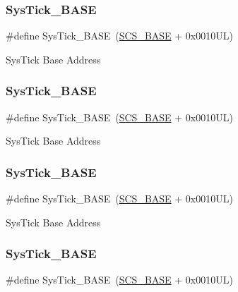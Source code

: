 \subsubsection{\texorpdfstring{SysTick\_BASE}{SysTick\_BASE}\hspace{0.1cm}{\footnotesize\ttfamily [5/12]}}
{\footnotesize\ttfamily \#define Sys\+Tick\+\_\+\+B\+A\+SE~(\mbox{\hyperlink{group___c_m_s_i_s__core__base_ga3c14ed93192c8d9143322bbf77ebf770}{S\+C\+S\+\_\+\+B\+A\+SE}} +  0x0010\+U\+L)}

Sys\+Tick Base Address \mbox{\label{group___c_m_s_i_s__core__base_ga58effaac0b93006b756d33209e814646}} 
\subsubsection{\texorpdfstring{SysTick\_BASE}{SysTick\_BASE}\hspace{0.1cm}{\footnotesize\ttfamily [6/12]}}
{\footnotesize\ttfamily \#define Sys\+Tick\+\_\+\+B\+A\+SE~(\mbox{\hyperlink{group___c_m_s_i_s__core__base_ga3c14ed93192c8d9143322bbf77ebf770}{S\+C\+S\+\_\+\+B\+A\+SE}} +  0x0010\+U\+L)}

Sys\+Tick Base Address \mbox{\label{group___c_m_s_i_s__core__base_ga58effaac0b93006b756d33209e814646}} 
\subsubsection{\texorpdfstring{SysTick\_BASE}{SysTick\_BASE}\hspace{0.1cm}{\footnotesize\ttfamily [7/12]}}
{\footnotesize\ttfamily \#define Sys\+Tick\+\_\+\+B\+A\+SE~(\mbox{\hyperlink{group___c_m_s_i_s__core__base_ga3c14ed93192c8d9143322bbf77ebf770}{S\+C\+S\+\_\+\+B\+A\+SE}} +  0x0010\+U\+L)}

Sys\+Tick Base Address \mbox{\label{group___c_m_s_i_s__core__base_ga58effaac0b93006b756d33209e814646}} 
\subsubsection{\texorpdfstring{SysTick\_BASE}{SysTick\_BASE}\hspace{0.1cm}{\footnotesize\ttfamily [8/12]}}
{\footnotesize\ttfamily \#define Sys\+Tick\+\_\+\+B\+A\+SE~(\mbox{\hyperlink{group___c_m_s_i_s__core__base_ga3c14ed93192c8d9143322bbf77ebf770}{S\+C\+S\+\_\+\+B\+A\+SE}} +  0x0010\+U\+L)}

